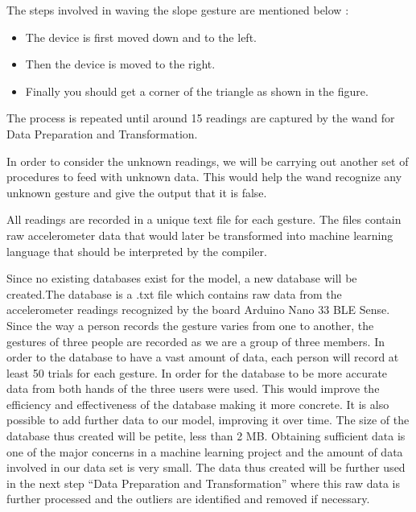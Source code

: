 	The steps involved in waving the slope gesture are mentioned below \cite{War:2020}:

\begin{center}
\end{center}

\begin{itemize}
	\item The device is first moved down and to the left.
	\item Then the device is moved to the right.
	\item Finally you should get a corner of the triangle as shown in the figure.
\end{itemize}

	The process is repeated until around 15 readings are captured by the wand for Data Preparation and Transformation. 

	In order to consider the unknown readings, we will be carrying out another set of procedures to feed with unknown data. This would help the wand recognize any unknown gesture and give the output that it is false. \cite{War:2020}

	All readings are recorded in a unique text file for each gesture. The files  \cite{DataPrep:21} contain raw accelerometer data that would later be transformed into machine learning language that should be interpreted by the compiler. \cite{War:2020}

	Since no existing databases exist for the model, a new database will be created.The database is a .txt file which contains raw data from the accelerometer readings recognized by the board Arduino Nano 33 BLE Sense. Since the way a person records the gesture varies from one to another, the gestures of three people are recorded as we are a group of three members. In order to the database to have a vast amount of data, each person will record at least 50 trials for each gesture. In order for the database to be more accurate data from both hands of the three users were used. This would improve the efficiency and effectiveness of the database making it more concrete. It is also possible to add further data to our model, improving it over time. The size of the database thus created will be petite, less than 2 MB. Obtaining sufficient data is one of the major concerns in a machine learning project and the amount of data involved in our data set is very small. The data thus created will be further used in the next step “Data Preparation and Transformation” where this raw data is further processed and the outliers are identified and removed if necessary.

